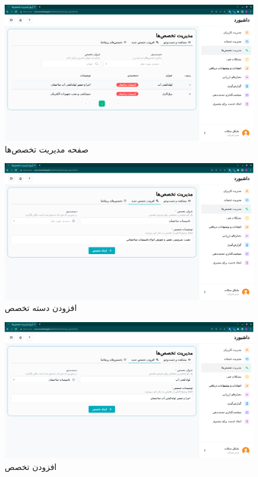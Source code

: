 \begin{figure}[h]
	\centering
	\includegraphics[width=\textwidth]{figs/user-guide/cm-manage-specialities}
	\caption{صفحه مدیریت تخصص‌ها}
	\label{cm-manage-specialities}
\end{figure}

\begin{figure}[h]
	\centering
	\includegraphics[width=\textwidth]{figs/user-guide/cm-add-category}
	\caption{افزودن دسته‌ تخصص}
	\label{cm-add-category}
\end{figure}

\begin{figure}[h]
	\centering
	\includegraphics[width=\textwidth]{figs/user-guide/cm-add-speciality}
	\caption{افزودن تخصص}
	\label{cm-add-speciality}
\end{figure}

